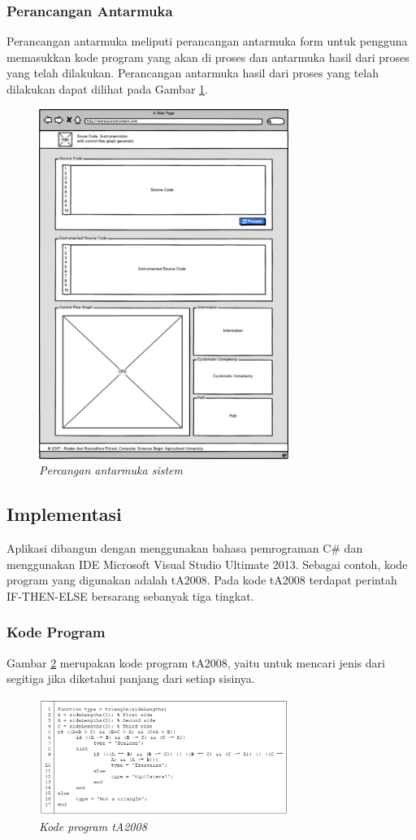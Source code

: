 \subsubsection*{Perancangan Antarmuka}
Perancangan antarmuka meliputi perancangan antarmuka form untuk pengguna memasukkan kode program yang akan di proses dan antarmuka hasil dari proses yang telah dilakukan. Perancangan antarmuka hasil dari proses yang telah dilakukan dapat dilihat pada Gambar \ref{fig:perancanganantarmuka}.
\begin{figure}[h!]
	\centering
	\includegraphics[width=230pt]{gambar/perancanganantarmuka}
	\caption{\textit{Percangan antarmuka sistem}}
	\label{fig:perancanganantarmuka}
\end{figure}

\subsection*{Implementasi}

Aplikasi dibangun dengan menggunakan bahasa pemrograman C\# dan menggunakan IDE Microsoft Visual Studio Ultimate 2013. 
Sebagai contoh, kode program yang digunakan adalah tA2008. Pada kode tA2008 terdapat perintah IF-THEN-ELSE bersarang sebanyak tiga tingkat. 

\subsubsection*{Kode Program}
Gambar \ref{fig:tA2008} merupakan kode program tA2008, yaitu untuk mencari jenis dari segitiga jika diketahui panjang dari setiap sisinya.
\begin{figure}[h!]
	\centering
	\includegraphics[width=230pt]{gambar/tA2008}
	\caption{\textit{Kode program tA2008}}
	\label{fig:tA2008}
\end{figure}

